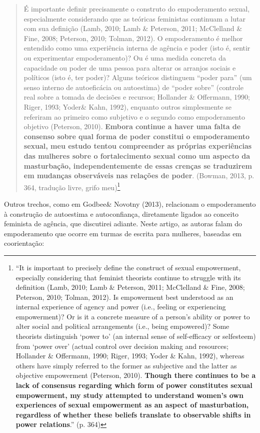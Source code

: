 \begin{quote}
    É importante definir precisamente o construto do empoderamento sexual, especialmente considerando que as teóricas feministas continuam a lutar com sua definição (Lamb, 2010; Lamb \& Peterson, 2011; McClelland \& Fine, 2008; Peterson, 2010; Tolman, 2012). O empoderamento é melhor entendido como uma experiência interna de agência e poder (isto é, sentir ou experimentar empoderamento)? Ou é uma medida concreta da capacidade ou poder de uma pessoa para alterar os arranjos sociais e políticos (isto é, ter poder)? Alguns teóricos distinguem “poder para” (um senso interno de autoeficácia ou autoestima) de “poder sobre” (controle real sobre a tomada de decisões e recursos; Hollander \& Offermann, 1990; Riger, 1993; Yoder\& Kahn, 1992), enquanto outros simplesmente se referiram ao primeiro como subjetivo e o segundo como empoderamento objetivo (Peterson, 2010). \textbf{Embora continue a haver uma falta de consenso sobre qual forma de poder constitui o empoderamento sexual, meu estudo tentou compreender as próprias experiências das mulheres sobre o fortalecimento sexual como um aspecto da masturbação, independentemente de essas crenças se traduzirem em mudanças observáveis nas relações de poder}. (Bowman, 2013, p. 364, tradução livre, grifo meu)\footnote{“It is important to precisely define the construct of sexual empowerment, especially considering that feminist theorists continue to struggle with its definition (Lamb, 2010; Lamb \& Peterson, 2011; McClelland \& Fine, 2008; Peterson, 2010; Tolman, 2012). Is empowerment best understood as an internal experience of agency and power (i.e., feeling or experiencing empowerment)? Or is it a concrete measure of a person’s ability or power to alter social and political arrangements (i.e., being empowered)? Some theorists distinguish ‘power to’ (an internal sense of self-efficacy or selfesteem) from ‘power over’ (actual control over decision making and resources; Hollander \& Offermann, 1990; Riger, 1993; Yoder \& Kahn, 1992), whereas others have simply referred to the former as subjective and the latter as objective empowerment (Peterson, 2010). \textbf{Though there continues to be a lack of consensus regarding which form of power constitutes sexual empowerment, my study attempted to understand women’s own experiences of sexual empowerment as an aspect of masturbation, regardless of whether these beliefs translate to observable shifts in power relations}.” (p. 364)}
\end{quote}

Outros trechos, como em Godbee\& Novotny (2013), relacionam o empoderamento à construção de autoestima e autoconfiança, diretamente ligados ao conceito feminista de agência, que discutirei adiante. Neste artigo, as autoras falam do empoderamento que ocorre em turmas de escrita para mulheres, baseadas em coorientação:

